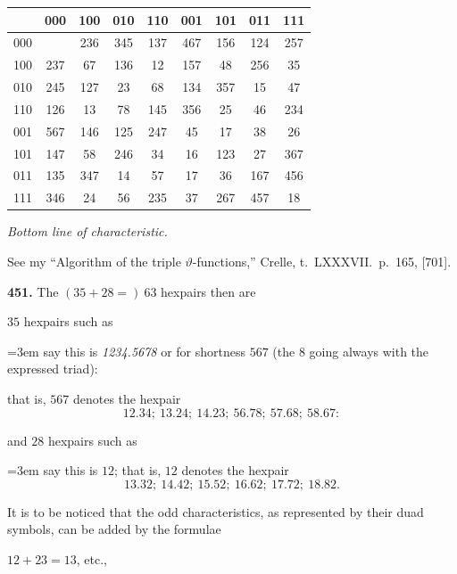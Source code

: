 \documentclass[11pt,a4paper]{book}
\begin{document}
\begin{center}
\small
\begin{tabular}{|c|c|c|c|c|c|c|c|c|}
\hline
 & 000 & 100 & 010 & 110 & 001 & 101 & 011 & 111 \\
\hline
000 &  & 236 & 345 & 137 & 467 & 156 & 124 & 257 \\
\hline
100 & 237 & 67 & 136 & 12 & 157 & 48 & 256 & 35 \\
\hline
010 & 245 & 127 & 23 & 68 & 134 & 357 & 15 & 47 \\
\hline
110 & 126 & 13 & 78 & 145 & 356 & 25 & 46 & 234 \\
\hline
001 & 567 & 146 & 125 & 247 & 45 & 17 & 38 & 26 \\
\hline
101 & 147 & 58 & 246 & 34 & 16 & 123 & 27 & 367 \\
\hline
011 & 135 & 347 & 14 & 57 & 17 & 36 & 167 & 456 \\
\hline
111 & 346 & 24 & 56 & 235 & 37 & 267 & 457 & 18 \\
\hline
\end{tabular}
\end{center}

\begin{center}
\small
\textit{Bottom line of characteristic.}
\end{center}

\vspace{1em}

See my ``Algorithm of the triple $\vartheta$-functions,'' Crelle, t.~LXXXVII.\ p.~165, [701].

\vspace{1em}

\noindent\textbf{451.}\quad
The $(35 + 28 =)\ 63$ hexpairs then are

$35$ hexpairs such as

\noindent\hangindent=3em say this is \textit{1234.5678} or for shortness $567$ (the $8$ going always with the expressed triad):

\noindent that is, $567$ denotes the hexpair
\[
12.34;\ 13.24;\ 14.23;\ 56.78;\ 57.68;\ 58.67:
\]

\noindent and $28$ hexpairs such as

\noindent\hangindent=3em say this is $12$; that is, $12$ denotes the hexpair
\[
13.32;\ 14.42;\ 15.52;\ 16.62;\ 17.72;\ 18.82.
\]

It is to be noticed that the odd characteristics, as represented by their duad symbols, can be added by the formulae

$12 + 23 = 13$, etc.,
\end{document}
